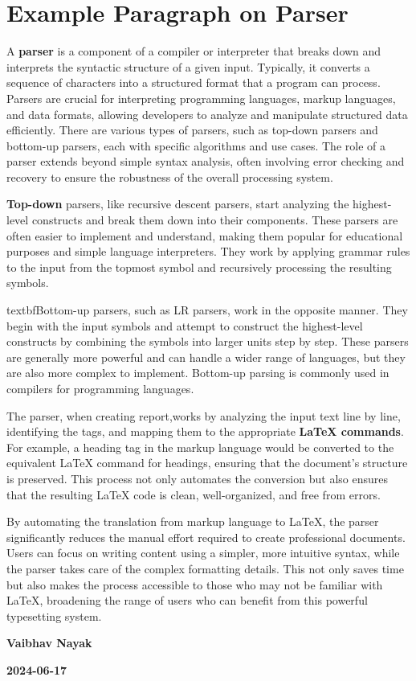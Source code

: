 \documentclass[oneside]{book}
\begin{document}
\section{Example Paragraph on Parser}
A \textbf{parser} is a component of a compiler or interpreter that breaks down and interprets the syntactic structure of a given input. Typically, it converts a sequence
            of characters into a structured format that a program can process. Parsers are crucial for interpreting programming languages, markup languages, and data formats,
            allowing developers to analyze and manipulate structured data efficiently. There are various types of parsers, such as top-down parsers and bottom-up parsers,
            each with specific algorithms and use cases. The role of a parser extends beyond simple syntax analysis, often involving error checking and recovery to ensure the 
            robustness of the overall processing system.\par
\textbf{Top-down} parsers, like recursive descent parsers, start analyzing the highest-level constructs and break them down into their components. These parsers are often
            easier to implement and understand, making them popular for educational purposes and simple language interpreters. They work by applying grammar rules to the input
            from the topmost symbol and recursively processing the resulting symbols.\par
textbf{Bottom-up} parsers, such as LR parsers, work in the opposite manner. They begin with the input symbols and attempt to construct the highest-level constructs by
            combining the symbols into larger units step by step. These parsers are generally more powerful and can handle a wider range of languages, but they are also more
            complex to implement. Bottom-up parsing is commonly used in compilers for programming languages.\par
The parser, when creating report,works by analyzing the input text line by line, identifying the tags, and mapping them to the appropriate \textbf{LaTeX commands}.
            For example, a heading tag in the markup language would be converted to the equivalent LaTeX command for headings, ensuring that the document's structure is preserved. This process not only
            automates the conversion but also ensures that the resulting LaTeX code is clean, well-organized, and free from errors.\par
By automating the translation from markup language to LaTeX, the parser significantly reduces the manual effort required to create professional documents.
             Users can focus on writing content using a simpler, more intuitive syntax, while the parser takes care of the complex formatting details.
              This not only saves time but also makes the process accessible to those who may not be familiar with LaTeX, broadening the range of users who can benefit from this powerful typesetting system.\par
\hfill \textbf{Vaibhav Nayak}\par
\hfill \textbf{2024-06-17}\par
\end{document}
